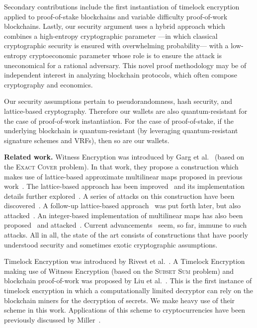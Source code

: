 Secondary contributions include the first instantiation of timelock encryption applied
to proof-of-stake blockchains and variable difficulty proof-of-work blockchains. Lastly,
our security argument uses a hybrid approach which combines a high-entropy
cryptographic parameter ---in which classical cryptographic security is ensured with overwhelming
probability--- with a low-entropy cryptoeconomic parameter whose role is to ensure the
attack is uneconomical for a rational adversary. This novel proof methodology may be of
independent interest in analyzing blockchain protocols, which often compose cryptography
and economics.

Our security assumptions pertain to pseudorandomness, hash security, and lattice-based cryptography.
Therefore our wallets are also quantum-resistant for the case of proof-of-work instantiation. For the
case of proof-of-stake, if the underlying blockchain is quantum-resistant (by leveraging quantum-resistant
signature schemes and VRFs), then so are our wallets.

\noindent
\textbf{Related work.}
Witness Encryption was introduced by Garg et al.~\cite{STOC:GGSW13} (based on the \textsc{Exact
Cover} problem). In that
work, they propose a construction which makes use of lattice-based approximate multilinear
maps proposed in previous work~\cite{EC:GarGenHal13}. The lattice-based approach has been
improved~\cite{EC:LanSteSte14} and its implementation details further explored~\cite{AC:ACLL15}.
A series of attacks on this construction have been discovered~\cite{EC:CHLRS15,EC:HuJia16,PKC:CLLT17,C:CGHLMM15,C:AlbBaiDuc16,EPRINT:CheJeoLee16}.
A follow-up lattice-based approach~\cite{TCC:GenGorHal15} was put forth later, but also attacked~\cite{C:CLLT16}.
An integer-based implementation of multilinear maps has also been proposed~\cite{C:CorLepTib13,C:CorLepTib15} and
attacked~\cite{EC:CHLRS15,EPRINT:MinFou15,EPRINT:CheLeeRyu15}.
Current advancements~\cite{ma2018mmap} seem, so far, immune to such attacks.
All in all, the state of the art consists of constructions that have poorly
understood security and sometimes exotic cryptographic assumptions.

Timelock Encryption was introduced by Rivest et al.~\cite{timelock}. A Timelock Encryption
making use of Witness Encryption (based on the \textsc{Subset Sum} problem) and blockchain proof-of-work was proposed by Liu et
al.~\cite{timelock-bitcoin}. This is the first instance of timelock encryption in which
a computationally limited decryptor can rely on the blockchain miners for the decryption
of secrets. We make heavy use of their scheme in this work. Applications of this scheme to cryptocurrencies
have been previously discussed by Miller~\cite{miller-timelock}.

